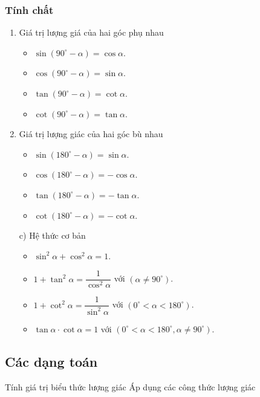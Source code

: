 \subsubsection{Tính chất}
\begin{multicols}{2}
\begin{enumerate}
	\item Giá trị lượng giá của hai góc phụ nhau
	\begin{itemize}
		\item $\sin(90^\circ-\alpha)=\cos\alpha$.
		\item $\cos(90^\circ-\alpha)=\sin\alpha$.
		\item $\tan(90^\circ-\alpha)=\cot\alpha$.
		\item $\cot(90^\circ-\alpha)=\tan\alpha$.
	\end{itemize}
	\item Giá trị lượng giác của hai góc bù nhau
	\begin{itemize}
		\item $\sin(180^\circ-\alpha)=\sin\alpha$.
		\item $\cos(180^\circ-\alpha)=-\cos\alpha$.
		\item $\tan(180^\circ-\alpha)=-\tan\alpha$.
		\item $\cot(180^\circ-\alpha)=-\cot\alpha$.
	\end{itemize}
\end{enumerate}
\end{multicols}
\begin{enumerate}
\item[c)] Hệ thức cơ bản
	\begin{itemize}
		\item $\sin^2\alpha+\cos^2\alpha=1$.
		\item $1+\tan^2\alpha=\dfrac{1}{\cos^2\alpha}$ với $(\alpha\ne 90^\circ)$.
		\item $1+\cot^2\alpha=\dfrac{1}{\sin^2\alpha}$ với $(0^\circ<\alpha< 180^\circ)$.
		\item $\tan\alpha\cdot\cot\alpha=1$ với $(0^\circ<\alpha< 180^\circ, \alpha\ne 90^\circ)$.
	\end{itemize}
\end{enumerate}
\subsection{Các dạng toán}
\begin{dang}{Tính giá trị biểu thức lượng giác}
	Áp dụng các công thức lượng giác
\end{dang}
